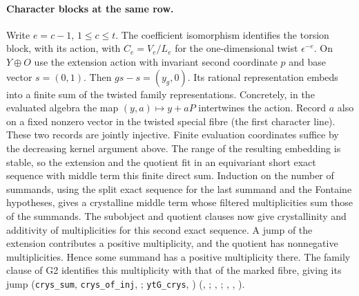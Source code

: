 \paragraph{Character blocks at the same row.}
Write $e=c-1$, $1\le c\le t$. The coefficient isomorphism identifies
the torsion block, with its action, with $C_e=V_e/L_e$ for the
one-dimensional twist $\epsilon^{-e}$. On $Y\oplus O$ use the extension
action with invariant second coordinate $p$ and base vector $s=(0,1)$.
Then $gs-s=(y_g,0)$. Its rational representation embeds into a finite
sum of the twisted family representations. Concretely, in the
evaluated algebra the map $(y,a)\mapsto y+aP$ intertwines the
action. Record $a$ also on a fixed nonzero vector in the twisted
special fibre (the first character line). These two records are jointly
injective. Finite evaluation coordinates suffice by the decreasing
kernel argument above. The range of the resulting embedding is stable, so the extension
and the quotient fit in an equivariant short exact sequence with
middle term this finite direct sum. Induction on the number of
summands, using the split exact sequence for the last summand and
the Fontaine hypotheses, gives a crystalline middle term whose
filtered multiplicities sum those of the summands. The subobject
and quotient clauses now give crystallinity and additivity of
multiplicities for this second exact sequence. A jump of the
extension contributes a positive multiplicity, and the quotient
has nonnegative multiplicities. Hence some summand has a positive
multiplicity there. The family clause of G2 identifies this
multiplicity with that of the marked fibre, giving its jump
(\nolinkurl{crys_sum}, \nolinkurl{crys_of_inj},
;
\nolinkurl{ytG_crys}, )
(, ;
, ;
, , ).

